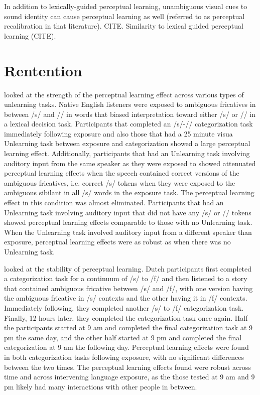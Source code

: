 In addition to lexically-guided perceptual learning, unambiguous visual cues to sound identity can cause perceptual learning as well (referred to as perceptual recalibration in that literature). CITE.  Similarity to lexical guided perceptual learning (CITE).


\section{Rentention}

\citet{Kraljic2005} looked at the strength of the perceptual learning effect across various types of unlearning tasks. 
 Native English listeners were exposed to ambiguous fricatives in between /s/ and /\textesh/ in words that biased interpretation toward either /s/ or /\textesh/ in a lexical decision task.
 Participants that completed an /s/-/\textesh/ categorization task immediately following exposure and also those that had a 25 minute visua Unlearning task between exposure and categorization showed a large perceptual learning effect.  
Additionally, participants that had an Unlearning task involving auditory input from the same speaker as they were exposed to showed attenuated perceptual learning effects when the speech contained correct versions of the ambiguous fricatives, i.e. correct /s/ tokens when they were exposed to the ambiguous sibilant in all /s/ words in the exposure task.  
The perceptual learning effect in this condition was almost eliminated. 
 Participants that had an Unlearning task involving auditory input that did not have any /s/ or /\textesh/ tokens showed perceptual learning effects comparable to those with no Unlearning task.  
When the Unlearning task involved auditory input from a different speaker than exposure, perceptual learning effects were as robust as when there was no Unlearning task.

\citet{Eisner2006} looked at the stability of perceptual learning. 
Dutch participants first completed a categorization task for a continuum of /s/ to /f/ and then listened to a story that contained ambiguous fricative between /s/ and /f/, with one version having the ambiguous fricative in /s/ contexts and the other having it in /f/ contexts.
Immediately following, they completed another /s/ to /f/ categorization task.  
Finally, 12 hours later, they completed the categorization task once again.
Half the participants started at 9 am and completed the final categorization task at 9 pm the same day, and the other half started at 9 pm and completed the final categorization at 9 am the following day.
Perceptual learning effects were found in both categorization tasks following exposure, with no significant differences between the two times. 
 The perceptual learning effects found were robust across time and across intervening language exposure, as the those tested at 9 am and 9 pm likely had many interactions with other people in between.

